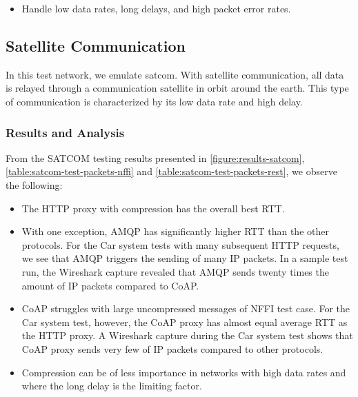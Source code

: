 \begin{itemize}

    \item Handle low data rates, long delays, and high packet error rates.

\end{itemize}



\subsection{Satellite Communication}

In this test network, we emulate \gls{satcom}. With satellite communication, all
data is relayed through a communication satellite in orbit around the earth.
This type of communication is characterized by its low data rate and high delay.

\subsubsection{Results and Analysis}

From the SATCOM testing results presented in \cref{figure:results-satcom},
\cref{table:satcom-test-packets-nffi} and \cref{table:satcom-test-packets-rest},
we observe the following:

\begin{itemize}

    \item The HTTP proxy with compression has the overall best RTT.

    \item With one exception, AMQP has significantly higher RTT than the other
    protocols. For the Car system tests with many subsequent HTTP requests, we
    see that AMQP triggers the sending of many IP packets. In a sample test run,
    the Wireshark capture revealed that AMQP sends twenty times the amount of IP
    packets compared to CoAP.

    \item CoAP struggles with large uncompressed messages of NFFI test case. For
    the Car system test, however, the CoAP proxy has almost equal average RTT as
    the HTTP proxy. A Wireshark capture during the Car system test shows that
    CoAP proxy sends very few of IP packets compared to other protocols.

    \item Compression can be of less importance in networks with high data
    rates and where the long delay is the limiting factor.

\end{itemize}

